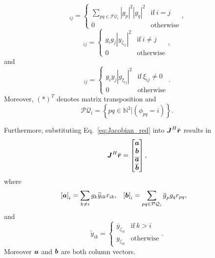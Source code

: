\documentclass[useAMS,usenatbib]{mn2e}
\newcommand{\bE}{\bmath{E}}
\newcommand{\bF}{\bmath{F}}
\newcommand{\br}{\bmath{r}}
\newcommand{\bJ}{\bmath{J}}
\newcommand{\ba}{\bmath{a}}
\newcommand{\bb}{\bmath{b}}
\newcommand{\conj}[1]{\overline{#1}}
\begin{document}
\begin{equation}
[\bE]_{ij} = 
\begin{cases}
 \sum_{pq \in \mathcal{PQ}_i} \left | g_p \right |^2 \left | g_q \right |^2  & \textrm{if} ~ i=j\\
 0 & \textrm{otherwise}
\end{cases},
\end{equation}
\begin{equation}
[\bF]_{ij} = 
\begin{cases}
 g_i g_j  \left | y_{\zeta_{ij}} \right |^2  & \textrm{if} ~ i \neq j\\
 0 & \textrm{otherwise}
\end{cases},
\end{equation}
and
\begin{equation}
[\boldsymbol{G}]_{ij} = 
\begin{cases}
 g_i y_j  \left | g_{\xi_{ij}} \right |^2  & \textrm{if} ~ \xi_{ij}\neq0\\
 0 & \textrm{otherwise}
\end{cases}.
\end{equation}
Moreover, $(*)^T$ denotes matrix transposition and
\begin{equation}
\mathcal{PQ}_i = \left\{pq\in\mathbb{N}^2|(\phi_{pq} = i) \right\}.
\end{equation}

Furthermore, substituting Eq.~\eqref{eq:Jacobian_red} into $\bJ^H\breve{\br}$ results in
\begin{equation}
\bJ^H\breve{\br} = \begin{bmatrix}
                   \ba \\
                   \bb \\
                   \conj{\ba}\\
                   \conj{\bb}
                   \end{bmatrix},
\end{equation}
where
\begin{align}
\label{eq:ab}
\left [ \ba \right ]_i &= \sum_{k\neq i} g_k \widetilde{y}_{ik}r_{ik},  & \left [ \bb \right ]_i &= \sum_{pq\in\mathcal{PQ}_i}\conj{g}_p g_q r_{pq},
\end{align}
and
\begin{equation}
\widetilde{y}_{ik} = 
\begin{cases}
\conj{y}_{\zeta_{ik}} & \textrm{if}~k > i\\
y_{\zeta_{ik}} & \textrm{otherwise}
\end{cases}.
\end{equation}
Moreover $\ba$ and $\bb$ are both column vectors.
\end{document}
